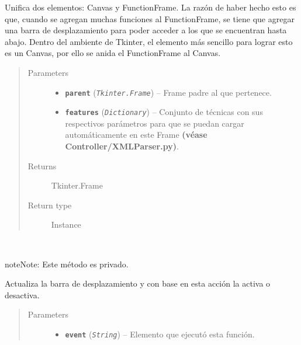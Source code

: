 \documentclass[class=report, crop=false]{standalone}
\begin{document}
\begin{fulllineitems}

\begin{DUlineblock}{0em}
\item[] Unifica dos elementos: Canvas y FunctionFrame.\break
La razón de haber hecho esto es que, cuando se agregan muchas 
funciones al FunctionFrame, se tiene que agregar una barra de 
desplazamiento para poder acceder a los que se encuentran hasta 
abajo.\break
Dentro del ambiente de Tkinter, el elemento más sencillo para 
lograr esto es un Canvas, por ello se anida el FunctionFrame al 
Canvas.
\end{DUlineblock}

\begin{quote}\begin{description}
\item[{Parameters}] \leavevmode\begin{itemize}
\item \textbf{\texttt{parent}} (\emph{\texttt{Tkinter.Frame}}) -- Frame padre al que pertenece.
\item \textbf{\texttt{features}} (\emph{\texttt{Dictionary}}) -- Conjunto de técnicas con sus respectivos parámetros para que se puedan cargar automáticamente en este Frame \textbf{(véase Controller/XMLParser.py)}.
\end{itemize}

\item[{Returns}] \leavevmode
Tkinter.Frame
\item[{Return type}] \leavevmode
Instance
\end{description}\end{quote}


\begin{fulllineitems}

~

\begin{notice}{note}{Note:}
Este método es privado.
\end{notice}

Actualiza la barra de desplazamiento y con base en esta acción
la activa o desactiva.

\begin{quote}\begin{description}
\item[{Parameters}] \leavevmode\begin{itemize}
\item \textbf{\texttt{event}} (\emph{\texttt{String}}) -- Elemento que ejecutó esta función.
\end{itemize}
\end{description}\end{quote}


\end{fulllineitems}
\end{fulllineitems}
\end{document}
